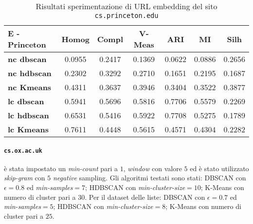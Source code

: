 \begin{table}[H]
	\begin{tabular}{| l | c | c | c | c | c | c |}
	\hline
	\textbf{E - Princeton}  & \textbf{Homog} & \textbf{Compl} & \textbf{V-Meas}  & \textbf{ARI}  & \textbf{MI}  & \textbf{Silh} \\ [3ex] \hline
	\textbf{nc dbscan} & 0.0955 & 0.2417 & 0.1369 & 0.0622 & 0.0886 & 0.2656\\ [3ex]
	 \hline 
	\textbf{nc hdbscan} & 0.2302 & 0.3292 & 0.2710 & 0.1651 & 0.2195 & 0.1687\\ [3ex]
	 \hline
	\textbf{nc Kmeans} & 0.4311 & 0.3637 & 0.3946 & 0.3404 & 0.3522 & 0.3877\\ [3ex]
	 \hline	
	\textbf{lc dbscan} & 0.5941 & 0.5696 & 0.5816 & 0.7706 & 0.5579 & 0.2269\\ [3ex]
	\hline
	\textbf{lc hdbscan} & 0.6531 & 0.5416 & 0.5922 & 0.7708 & 0.5275 & 0.1789\\ [3ex]
	\hline
	\textbf{lc Kmeans} & 0.7611 & 0.4448 & 0.5615 & 0.4571 & 0.4304 & 0.2282\\ [3ex]
	\hline
	\end{tabular}
	\caption{Risultati sperimentazione di URL embedding del sito \texttt{cs.princeton.edu}}
	\label{metricheEmbedPrinc}
\end{table}

\paragraph{\texttt{cs.ox.ac.uk}} è stata impostato un \textit{min-count} pari a $1$, \textit{window} con valore $5$ ed è stato utilizzato \textit{skip-gram} con $5$ \textit{negative} sampling. Gli algoritmi testati sono stati: DBSCAN con $\epsilon = 0.8$ ed \textit{min-samples}$ = 7$; HDBSCAN con \textit{min-cluster-size}$=10$; K-Means con numero di cluster pari a $30$. Per il dataset delle liste: DBSCAN con $\epsilon = 0.7$ ed \textit{min-samples}$ = 5$; HDBSCAN con \textit{min-cluster-size}$=8$; K-Means con numero di cluster pari a $25$.


